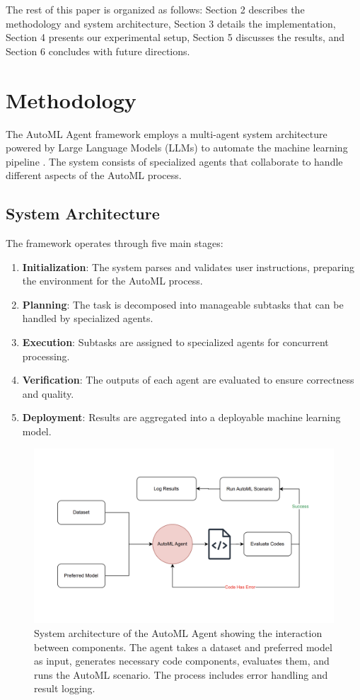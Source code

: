\documentclass[11pt]{article}
\begin{document}
The rest of this paper is organized as follows: Section 2 describes the methodology and system architecture, Section 3 details the implementation, Section 4 presents our experimental setup, Section 5 discusses the results, and Section 6 concludes with future directions.

\section{Methodology}
The AutoML Agent framework employs a multi-agent system architecture powered by Large Language Models (LLMs) to automate the machine learning pipeline \citep{guo2024largelanguagemodelbased}. The system consists of specialized agents that collaborate to handle different aspects of the AutoML process.

\subsection{System Architecture}
The framework operates through five main stages:
\begin{enumerate}
    \item \textbf{Initialization}: The system parses and validates user instructions, preparing the environment for the AutoML process.
    \item \textbf{Planning}: The task is decomposed into manageable subtasks that can be handled by specialized agents.
    \item \textbf{Execution}: Subtasks are assigned to specialized agents for concurrent processing.
    \item \textbf{Verification}: The outputs of each agent are evaluated to ensure correctness and quality.
    \item \textbf{Deployment}: Results are aggregated into a deployable machine learning model.
\end{enumerate}

\begin{figure}[htbp]
    \centering
    \includegraphics[width=\textwidth]{methodology-diagram}
    \caption{System architecture of the AutoML Agent showing the interaction between components. The agent takes a dataset and preferred model as input, generates necessary code components, evaluates them, and runs the AutoML scenario. The process includes error handling and result logging.}
    \label{fig:methodology}
\end{figure}
\end{document}
